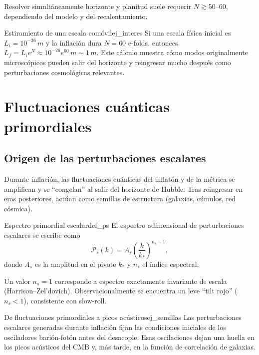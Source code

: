Resolver simultáneamente horizonte y planitud suele requerir $N\gtrsim 50$--$60$, dependiendo del modelo y del recalentamiento.

\begin{ejemplo}{Estiramiento de una escala comóvil}{ej_interes}
Si una escala física inicial es $L_i=10^{-26}\,\si{m}$ y la inflación dura $N=60$ e-folds, entonces $L_f=L_i e^{N}\approx 10^{-26}e^{60}\,\si{m}\sim 1\,\si{m}$. Este cálculo muestra cómo modos originalmente microscópicos pueden salir del horizonte y reingresar mucho después como perturbaciones cosmológicas relevantes.
\end{ejemplo}

\section{Fluctuaciones cuánticas primordiales}
\label{sec:fluctuaciones}

\subsection{Origen de las perturbaciones escalares}

Durante inflación, las fluctuaciones cuánticas del inflatón y de la métrica se amplifican y se ``congelan'' al salir del horizonte de Hubble. Tras reingresar en eras posteriores, actúan como semillas de estructura (galaxias, cúmulos, red cósmica).

\begin{definicion}{Espectro primordial escalar}{def_ps}
El espectro adimensional de perturbaciones escalares se escribe como
\begin{equation}
  \mathcal{P}_s(k)=A_s\left(\frac{k}{k_*}\right)^{n_s-1},
\end{equation}
donde $A_s$ es la amplitud en el pivote $k_*$ y $n_s$ el índice espectral.
\end{definicion}

Un valor $n_s=1$ corresponde a espectro exactamente invariante de escala (Harrison--Zel'dovich). Observacionalmente se encuentra un leve ``tilt rojo'' ($n_s<1$), consistente con slow-roll.

\begin{ejemplo}{De fluctuaciones primordiales a picos acústicos}{ej_semillas}
Las perturbaciones escalares generadas durante inflación fijan las condiciones iniciales de los osciladores barión-fotón antes del desacople. Esas oscilaciones dejan una huella en los picos acústicos del CMB y, más tarde, en la función de correlación de galaxias.
\end{ejemplo}

